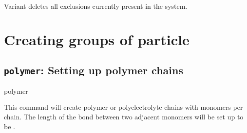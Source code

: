 Variant  deletes all exclusions currently present in the
system.

\section{Creating groups of particle}

\subsection{\texttt{polymer}: Setting up polymer chains}

\begin{essyntax}
  polymer 
   
  \\
  \begin{features}
  \end{features}
\end{essyntax}

This command will create  polymer or
polyelectrolyte chains with  monomers per
chain. The length of the bond between two adjacent monomers will be
set up to be .

